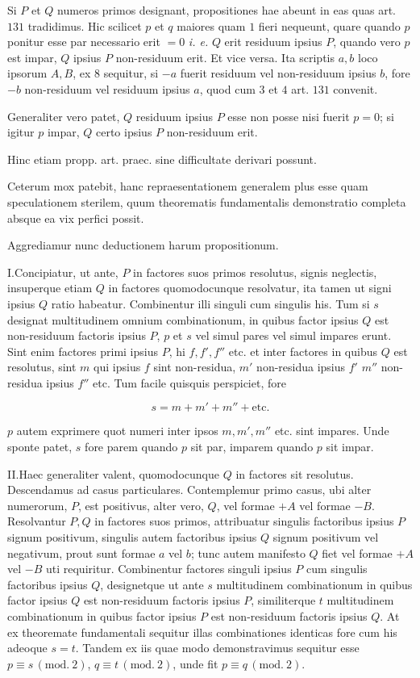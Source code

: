 Si $P$ et $Q$ numeros primos designant, propositiones hae abeunt in eas quas art. $131$ tradidimus. Hic scilicet $p$ et $q$ maiores quam $1$ fieri nequeunt, quare quando $p$ ponitur esse par necessario erit $=0$ \emph{i. e.} $Q$ erit residuum ipsius $P$, quando vero $p$ est impar, $Q$ ipsius $P$ non-residuum erit. Et vice versa. Ita scriptis $a,b$ loco ipsorum $A,B$, ex $8$ sequitur, si $-a$ fuerit residuum vel non-residuum ipsius $b$, fore $-b$ non-residuum vel residuum ipsius $a$, quod cum $3$ et $4$ art. $131$ convenit.

Generaliter vero patet, $Q$ residuum ipsius $P$ esse non posse nisi fuerit $p=0$; si igitur $p$ impar, $Q$ certo ipsius $P$ non-residuum erit.

Hinc etiam propp. art. praec. sine difficultate derivari possunt.

Ceterum mox patebit, hanc repraesentationem generalem plus esse quam speculationem sterilem, quum theorematis fundamentalis demonstratio completa absque ea vix perfici possit.


Aggrediamur nunc deductionem harum propositionum.

I.\quad Concipiatur, ut ante, $P$ in factores suos primos resolutus, signis neglectis, insuperque etiam $Q$ in factores quomodocunque resolvatur, ita tamen ut signi ipsius $Q$ ratio habeatur. Combinentur illi singuli cum singulis his. Tum si $s$ designat multitudinem omnium combinationum, in quibus factor ipsius $Q$ est non-residuum factoris ipsius $P$, $p$ et $s$ vel simul pares vel simul impares erunt. Sint enim factores primi ipsius $P$, hi $f,f',f''$ etc. et inter factores in quibus $Q$ est resolutus, sint $m$ qui ipsius $f$ sint non-residua, $m'$ non-residua ipsius $f'$ $m''$ non-residua ipsius $f''$ etc. Tum facile quisquis perspiciet, fore

\[
s=m+m'+m''+\text{etc.}
\]

$p$ autem exprimere quot numeri inter ipsos $m,m',m''$ etc. sint impares. Unde sponte patet, $s$ fore parem quando $p$ sit par, imparem quando $p$ sit impar.

II.\quad Haec generaliter valent, quomodocunque $Q$ in factores sit resolutus. Descendamus ad casus particulares. Contemplemur primo casus, ubi alter numerorum, $P$, est positivus, alter vero, $Q$, vel formae $+A$ vel formae $-B$. Resolvantur $P,Q$ in factores suos primos, attribuatur singulis factoribus ipsius $P$ signum positivum, singulis autem factoribus ipsius $Q$ signum positivum vel negativum, prout sunt formae $a$ vel $b$; tunc autem manifesto $Q$ fiet vel formae $+A$ vel $-B$ uti requiritur. Combinentur factores singuli ipsius $P$ cum singulis factoribus ipsius $Q$, designetque ut ante $s$ multitudinem combinationum in quibus factor ipsius $Q$ est non-residuum factoris ipsius $P$, similiterque $t$ multitudinem combinationum in quibus factor ipsius $P$ est non-residuum factoris ipsius $Q$. At ex theoremate fundamentali sequitur illas combinationes identicas fore cum his adeoque $s=t$. Tandem ex iis quae modo demonstravimus sequitur esse $p\equiv s\, (\mathrm{mod.}\ 2)$, $q\equiv t\, (\mathrm{mod.}\ 2)$, unde fit $p\equiv q\, (\mathrm{mod.}\ 2)$.

